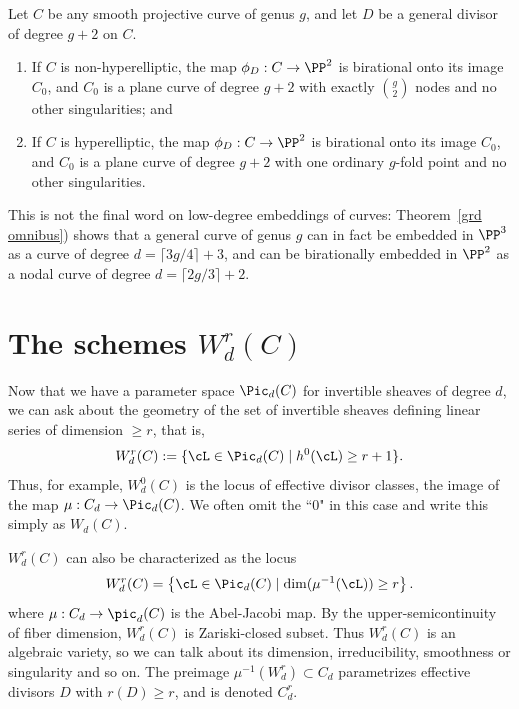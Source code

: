 \begin{theorem}[$g+2$ theorem]\label{g+2 theorem}
Let $C$ be any smooth projective curve of genus $g$, and let $D$ be a general divisor of degree $g+2$ on $C$. 
\begin{enumerate}
\item If $C$ is non-hyperelliptic, the map $\phi_D : C \to \PP^2$ is birational onto its image $C_0$, and $C_0$ is a plane curve of degree $g+2$ with exactly $\binom{g}{2}$ nodes and no other singularities; and
\item If $C$ is hyperelliptic, the map $\phi_D : C \to \PP^2$ is birational onto its image $C_0$, and $C_0$ is a plane curve of degree $g+2$ with one ordinary $g$-fold point and no other singularities.
\end{enumerate}
\end{theorem}

This is not the final word on low-degree embeddings of curves: Theorem~\ref{grd omnibus}) shows that a general curve of genus $g$ can in fact be embedded in $\PP^{3}$ as a curve of degree $d = \lceil 3g/4 \rceil + 3$, and can be birationally embedded in $\PP^2$ as a nodal curve of degree $d = \lceil 2g/3 \rceil + 2$.

\section{The schemes $W^r_d(C)$}

Now that we have a parameter space $\Pic_d(C)$ for invertible sheaves of degree $d$, we can ask about the geometry of the set of invertible sheaves defining linear series of dimension $\geq r$, that is,
$$
W^r_d(C) := \{ \cL \in \Pic_d(C) \mid h^0(\cL) \geq r+1 \}.
$$
Thus, for example, $W^0_d(C)$ is the locus of effective divisor classes, the image of the map $\mu : C_d \to \Pic_d(C)$. We often omit the ``0" in this case and write this simply as $W_d(C)$.

$W^r_d(C)$ can also be characterized as the locus
$$
W^r_d(C) = \left\{ \cL \in \Pic_d(C) \mid \dim(\mu^{-1}(\cL)) \geq r \right\}.
$$
where $\mu : C_d \to \pic_d(C)$ is the Abel-Jacobi map. By the upper-semicontinuity of fiber dimension, $W^r_d(C)$ is Zariski-closed subset.
Thus $W^r_d(C)$ is an algebraic variety, so we can talk about its dimension, irreducibility, smoothness or singularity and so on. The preimage $\mu^{-1}(W^r_d) \subset C_d$ parametrizes effective divisors $D$ with $r(D) \geq r$, and is denoted $C^r_d$.

